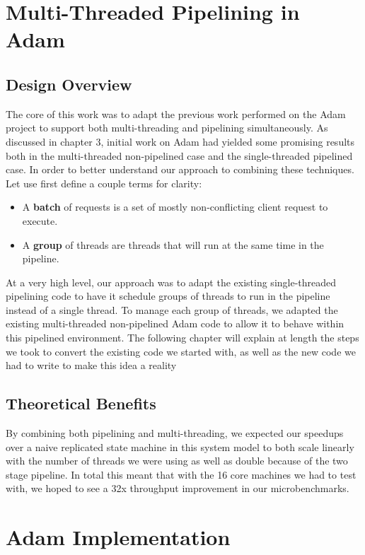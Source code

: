 \documentclass[11pt, oneside]{report}
\begin{document}
\chapter{Multi-Threaded Pipelining in Adam}\label{AdamDesign}

\section{Design Overview}

The core of this work was to adapt the previous work performed on the Adam project to support both multi-threading and pipelining simultaneously. 
As discussed in chapter 3, initial work on Adam had yielded some promising results both in the multi-threaded non-pipelined case and the single-threaded pipelined case. 
In order to better understand our approach to combining these techniques. 
Let use first define a couple terms for clarity:
\begin{itemize}
\item A \textbf{batch} of requests is a set of mostly non-conflicting client request to execute.
\item A \textbf{group} of threads are threads that will run at the same time in the pipeline.
\end{itemize}

At a very high level, our approach was to adapt the existing single-threaded pipelining code to have it schedule groups of threads to run in the pipeline instead of a single thread. 
To manage each group of threads, we adapted the existing multi-threaded non-pipelined Adam code to allow it to behave within this pipelined environment. 
The following chapter will explain at length the steps we took to convert the existing code we started with, as well as the new code we had to write to make this idea a reality

\section{Theoretical Benefits}

By combining both pipelining and multi-threading, we expected our speedups over a naive replicated state machine in this system model to both scale linearly with the number of threads we were using as well as double because of the two stage pipeline. 
In total this meant that with the 16 core machines we had to test with, we hoped to see a 32x throughput improvement in our microbenchmarks.

\chapter{Adam Implementation}\label{AdamImplementation}
\end{document}
